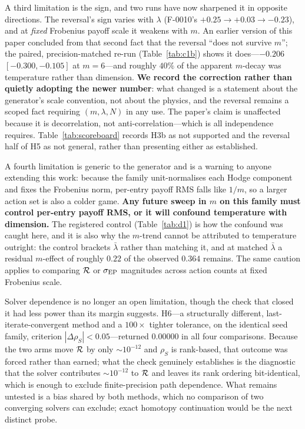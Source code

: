 A third limitation is the sign, and two runs have now sharpened it in opposite directions.
The reversal's sign varies with $\lambda$ (F-0010's $+0.25\to+0.03\to-0.23$), and at
\emph{fixed} Frobenius payoff scale it weakens with $m$. An earlier version of this paper
concluded from that second fact that the reversal ``does not survive $m$''; the paired,
precision-matched re-run (Table~\ref{tab:c1b}) shows it does---$-0.206$ $[-0.300,-0.105]$ at
$m=6$---and roughly $40\%$ of the apparent $m$-decay was temperature rather than dimension.
\textbf{We record the correction rather than quietly adopting the newer number}: what
changed is a statement about the generator's scale convention, not about the physics, and
the reversal remains a scoped fact requiring $(m,\lambda,N)$ in any use. The paper's claim
is unaffected because it is decorrelation, not anti-correlation---which is all independence
requires. Table~\ref{tab:scoreboard} records H3b as not supported and the reversal half of
H5 as not general, rather than presenting either as established.

A fourth limitation is generic to the generator and is a warning to anyone extending this
work: because the family unit-normalises each Hodge component and fixes the Frobenius norm,
per-entry payoff RMS falls like $1/m$, so a larger action set is also a colder game. \textbf{Any
future sweep in $m$ on this family must control per-entry payoff RMS, or it will confound
temperature with dimension.} The registered control (Table~\ref{tab:d1}) is how the confound
was caught here, and it is also why the $m$-trend cannot be attributed to temperature
outright: the control brackets $\bar\lambda$ rather than matching it, and at matched
$\bar\lambda$ a residual $m$-effect of roughly $0.22$ of the observed $0.364$ remains. The
same caution applies to comparing $\mathcal{R}$ or $\sigma_{\mathrm{EP}}$ magnitudes across action
counts at fixed Frobenius scale.

Solver dependence is no longer an open limitation, though the check that closed it had less
power than its margin suggests. H6---a structurally different, last-iterate-convergent method
and a $100\times$ tighter tolerance, on the identical seed family, criterion
$|\Delta\rho_S|<0.05$---returned $0.00000$ in all four comparisons. Because the two arms move
$\mathcal{R}$ by only $\sim\!10^{-12}$ and $\rho_S$ is rank-based, that outcome was forced rather than
earned; what the check genuinely establishes is the diagnostic that the solver contributes
$\sim\!10^{-12}$ to $\mathcal{R}$ and leaves its rank ordering bit-identical, which is enough to
exclude finite-precision path dependence. What remains untested is a bias shared by both
methods, which no comparison of two converging solvers can exclude; exact homotopy
continuation would be the next distinct probe.

